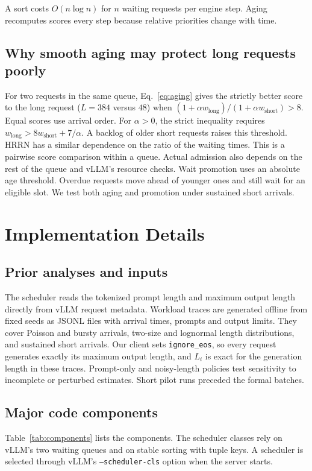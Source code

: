 \documentclass[sigplan,nonacm]{acmart}
\begin{document}
A sort costs $O(n\log n)$ for $n$ waiting requests per engine step.
Aging recomputes scores every step because relative priorities change
with time.

\subsection{Why smooth aging may protect long requests poorly}
\label{sec:aging-analysis}
For two requests in the same queue, Eq.~\eqref{eq:aging} gives
the strictly better score to the long request ($L=384$ versus $48$)
when $(1+\alpha w_{\text{long}})/(1+\alpha w_{\text{short}})>8$.
Equal scores use arrival order. For $\alpha>0$, the strict inequality
requires $w_{\text{long}}>8w_{\text{short}}+7/\alpha$. A backlog of
older short requests raises this threshold. HRRN has a similar
dependence on the ratio of the waiting times. This is a pairwise
score comparison within a queue. Actual admission also depends on
the rest of the queue and vLLM's resource checks.
Wait promotion uses an absolute age threshold. Overdue requests
move ahead of younger ones and still wait for an eligible slot.
We test both aging and promotion under sustained short arrivals.

\section{Implementation Details}
\label{sec:impl}

\subsection{Prior analyses and inputs}
The scheduler reads the tokenized prompt length and maximum output
length directly from vLLM request metadata. Workload traces are
generated offline from fixed seeds as JSONL files with arrival times,
prompts and output limits. They cover Poisson and bursty arrivals,
two-size and lognormal length distributions, and sustained short
arrivals. Our client sets \texttt{ignore\_eos}, so every
request generates exactly its maximum output length, and $L_i$ is
exact for the generation length in these traces. Prompt-only
and noisy-length policies test sensitivity to incomplete or perturbed
estimates. Short pilot runs preceded the formal batches.

\subsection{Major code components}
Table~\ref{tab:components} lists the components. The scheduler classes
rely on vLLM's two waiting queues and on stable sorting with tuple keys.
A scheduler is selected through vLLM's \texttt{--scheduler-cls} option
when the server starts.
\end{document}
